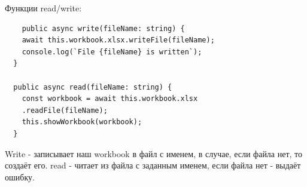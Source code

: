 \documentclass[utf8,14pt,a4paper,oneside,russian]{book}
\begin{document}
  Функции read/write:
  \begin{lstlisting}
    public async write(fileName: string) {
    await this.workbook.xlsx.writeFile(fileName);
    console.log(`File {fileName} is written`);
  }

  public async read(fileName: string) {
    const workbook = await this.workbook.xlsx
    .readFile(fileName);
    this.showWorkbook(workbook);
  }
\end{lstlisting}

Write  - записывает наш workbook в файл с именем, в случае, если файла нет, то создаёт его.
read - читает из файла с заданным именем, если файла нет - выдаёт ошибку.

\begin{center}
\end{center}

\newpage
\end{document}
